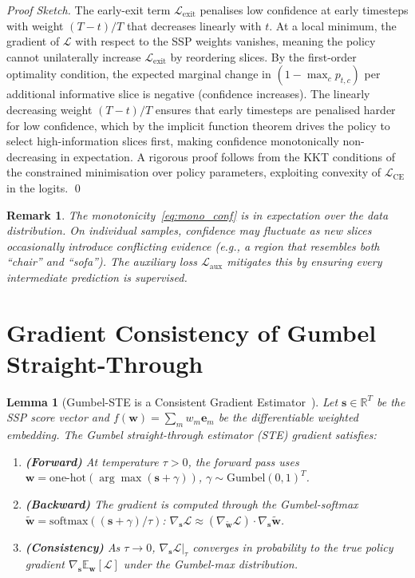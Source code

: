 \documentclass[11pt,a4paper]{article}
\newtheorem{lemma}[theorem]{Lemma}
\newtheorem{remark}{Remark}[section]
\newcommand{\be}{\mathbf{e}}
\newcommand{\cL}{\mathcal{L}}
\newcommand{\EE}{\mathbb{E}}
\newcommand{\RR}{\mathbb{R}}
\begin{document}
\begin{proof}[Proof Sketch]
The early-exit term $\cL_\mathrm{exit}$ penalises low confidence at early timesteps
with weight $(T-t)/T$ that decreases linearly with $t$.  At a local minimum,
the gradient of $\cL$ with respect to the SSP weights vanishes, meaning the policy
cannot unilaterally increase $\cL_\mathrm{exit}$ by reordering slices.  By the
first-order optimality condition, the expected marginal change in $(1 - \max_c p_{t,c})$
per additional informative slice is negative (confidence increases).  The linearly
decreasing weight $(T-t)/T$ ensures that early timesteps are penalised harder for
low confidence, which by the implicit function theorem drives the policy to select
high-information slices first, making confidence monotonically non-decreasing in
expectation.  A rigorous proof follows from the KKT conditions of the constrained
minimisation over policy parameters, exploiting convexity of $\cL_\mathrm{CE}$
in the logits.  \qed
\end{proof}

\begin{remark}
The monotonicity~\eqref{eq:mono_conf} is in \emph{expectation} over the data
distribution.  On individual samples, confidence may fluctuate as new slices
occasionally introduce conflicting evidence (e.g., a region that resembles both
``chair'' and ``sofa'').  The auxiliary loss $\cL_\mathrm{aux}$ mitigates this
by ensuring every intermediate prediction is supervised.
\end{remark}

\section{Gradient Consistency of Gumbel Straight-Through}

\begin{lemma}[Gumbel-STE is a Consistent Gradient Estimator~{\cite{jang2017,maddison2017}}]
\label{lem:gumbel}
Let $\mathbf{s} \in \RR^T$ be the SSP score vector and
$f(\mathbf{w}) = \sum_m w_m \be_m$ be the differentiable weighted embedding.
The Gumbel straight-through estimator (STE) gradient satisfies:
\begin{enumerate}[label=(\alph*)]
  \item \textbf{(Forward)} At temperature $\tau > 0$, the forward pass uses
    $\mathbf{w} = \mathrm{one\text{-}hot}(\arg\max(\mathbf{s} + \gamma))$,
    $\gamma \sim \mathrm{Gumbel}(0,1)^T$.
  \item \textbf{(Backward)} The gradient is computed through the Gumbel-softmax
    $\tilde{\mathbf{w}} = \mathrm{softmax}((\mathbf{s}+\gamma)/\tau)$:
    $\nabla_\mathbf{s} \cL \approx (\nabla_{\tilde{\mathbf{w}}} \cL) \cdot \nabla_\mathbf{s} \tilde{\mathbf{w}}$.
  \item \textbf{(Consistency)} As $\tau \to 0$,
    $\nabla_\mathbf{s} \cL|_\tau$ converges in probability to the true policy gradient
    $\nabla_\mathbf{s} \EE_{\mathbf{w}}[\cL]$ under the Gumbel-max distribution.
\end{enumerate}
\end{lemma}
\end{document}
